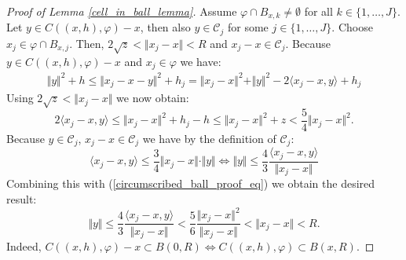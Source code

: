 \documentclass{article}
\theoremstyle{plain}
\theoremstyle{remark}
\theoremstyle{definition}
\begin{document}
\begin{proof}[Proof of Lemma  \ref{cell_in_ball_lemma}]
    Assume $\varphi \cap B_{x,k} \neq \emptyset$ for all $k \in \{1,\dots,J\}$. Let $y \in C((x,h),\varphi) - x$, then also $y \in \mathcal{C}_j$ for some $j \in \{1,\dots,J\}$. Choose $x_j \in \varphi \cap B_{x,j}$. Then, $2\sqrt{z} < \Vert x_j - x \Vert < R$ and $x_j - x \in \mathcal{C}_j$. Because $y \in C((x,h),\varphi) - x$ and $x_j \in \varphi$ we have:
    \begin{align*}
        \Vert y \Vert^2 +h \leq \Vert x_j - x - y \Vert^2 + h_j = \Vert x_j -x\Vert^2 + \Vert y \Vert^2 -2 \langle x_j -x,y\rangle + h_j
    \end{align*}
    Using $2\sqrt{z} < \Vert x_j - x \Vert$ we now obtain:
    \begin{equation}
        2\langle x_j - x,y\rangle \leq  \Vert x_j -x\Vert^2 + h_j - h \leq \Vert x_j -x\Vert^2 + z < \frac{5}{4}\Vert x_j - x \Vert^2.\label{circumscribed_ball_proof_eq}
    \end{equation}
    Because $y \in \mathcal{C}_j$, $x_j -x \in \mathcal{C}_j$ we have by the definition of $\mathcal{C}_j$:
    \[\langle x_j - x,y\rangle \leq \frac{3}{4}\Vert x_j - x\Vert \cdot \Vert y \Vert \iff \Vert y \Vert \leq \frac{4}{3}\frac{\langle x_j -x,y\rangle}{\Vert x_j - x \Vert}\]
    Combining this with (\ref{circumscribed_ball_proof_eq}) we obtain the desired result:
    \[\Vert y \Vert \leq \frac{4}{3}\frac{\langle x_j -x,y\rangle}{\Vert x_j - x \Vert} < \frac{5}{6} \frac{\Vert x_j - x \Vert^2}{\Vert x_j - x \Vert} < \Vert x_j - x \Vert < R.\]
    Indeed, $C((x,h),\varphi) - x \subset B(0,R) \iff C((x,h),\varphi) \subset B(x,R)$. 
\end{proof}
\end{document}
